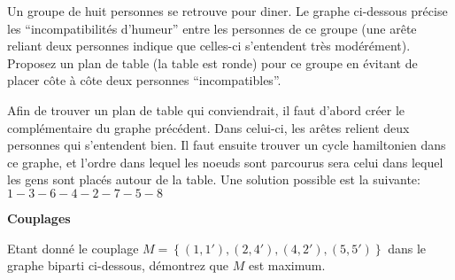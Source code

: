 Un groupe de huit personnes se retrouve pour diner. Le graphe ci-dessous précise les ``incompatibilités d'humeur'' entre les personnes de ce groupe (une arête reliant deux personnes indique que celles-ci s'entendent très modérément). Proposez un plan de table (la table est ronde) pour ce groupe en évitant de placer côte à côte deux personnes ``incompatibles''.

\begin{figure}[h!]
  \begin{center}
  \end{center}
\end{figure}

\begin{solution}
Afin de trouver un plan de table qui conviendrait, il faut d'abord créer le complémentaire du graphe précédent. Dans celui-ci, les arêtes relient deux personnes qui s'entendent bien. Il faut ensuite trouver un cycle hamiltonien dans ce graphe, et l'ordre dans lequel les noeuds sont parcourus sera celui dans lequel les gens sont placés autour de la table. Une solution possible est la suivante:$1-3-6-4-2-7-5-8$
\end{solution}

\newpage

\textbf{Couplages}

Etant donné le couplage $M = \left\lbrace  (1,1'), (2,4'),(4,2'),(5,5')  \right\rbrace$ dans le graphe biparti ci-dessous, démontrez que $M$ est maximum.

